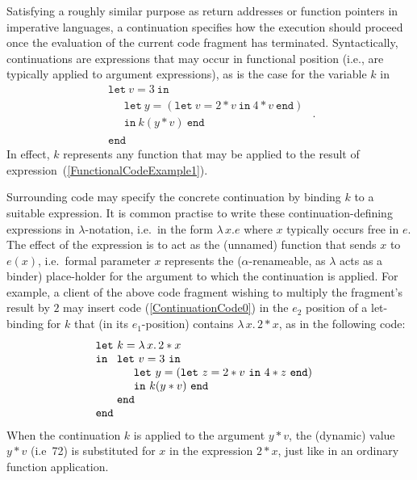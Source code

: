 Satisfying a roughly similar purpose as return addresses or function
pointers in imperative languages, a continuation specifies how the
execution should proceed once the evaluation of the current code
fragment has terminated. Syntactically, continuations are expressions
that may occur in functional position (i.e., are typically applied to
argument expressions), as is the case for the variable $k$ in
\begin{equation}
\label{ContinuationCode0}
\begin{array}{l}
  \texttt{let}\ v = 3\ \texttt{in}\\
  \quad \begin{array}{l} 
    \texttt{let}\ y = (\texttt{let}\ v=2*v \ \texttt{in}\ 4*v\ \texttt{end})\\
    \texttt{in}\ k (y*v)\ \texttt{end}
  \end{array}\\
  \texttt{end}
  \end{array}.
\end{equation}
In effect, $k$ represents any function that may be applied to the
result of expression~(\ref{FunctionalCodeExample1}).

Surrounding code may specify the concrete continuation by binding $k$
to a suitable expression. It is common practise to write these
continuation-defining expressions in $\lambda$-notation, i.e.~in the
form $\lambda\, x. e$ where $x$ typically occurs free in $e$. The
effect of the expression is to act as the (unnamed) function that
sends $x$ to $e(x)$, i.e.~formal parameter $x$ represents the
($\alpha$-renameable, as $\lambda$ acts as a binder) place-holder for
the argument to which the continuation is applied. For example, a
client of the above code fragment wishing to multiply the fragment's
result by $2$ may insert code (\ref{ContinuationCode0}) in the $e_2$
position of a let-binding for $k$ that (in its $e_1$-position)
contains $\lambda\, x .\, 2* x$, as in the following code:
$$\begin{array}{l}
\texttt{let}\ k = \lambda\, x .\, 2* x\\ 
\texttt{in}\ 
  \begin{array}[t]{l}
    \texttt{let}\ v = 3\ \texttt{in}\\
    \quad \begin{array}{l} 
      \texttt{let}\ y = (\texttt{let}\ z=2*v \ \texttt{in}\ 4*z\ \texttt{end})\\
      \texttt{in}\ k (y*v)\ \texttt{end}
    \end{array}\\
    \texttt{end}
  \end{array}\\ 
\texttt{end}
\end{array}
$$ 
When the continuation $k$ is applied to the argument $y*v$, the
(dynamic) value $y*v$ (i.e~72) is substituted for $x$ in the
expression $2*x$, just like in an ordinary function application.

